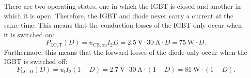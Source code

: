 \begin{solutionblock}
There are two operating states, one in which the IGBT is closed and another in which it is open. Therefore, the IGBT and diode never carry a current at the same time. This means that the conduction losses of the IGBT only occur when it is switched on:
\begin{equation}
    P_{\mathrm{LC,T}}(D) = u_{\mathrm{CE,on}} I_\mathrm{2}  D = \SI {2.5}{\volt}\cdot \SI {30}{\ampere} \cdot D = \SI {75}{\watt} \cdot D .
\end{equation}
Furthermore, this means that the forward losses of the diode only occur when the IGBT is switched off:
\begin{equation}
    P_{\mathrm{LC,D}}(D) = u_{\mathrm{f}} I_\mathrm{2} (1-D)= \SI {2.7}{\volt}\cdot \SI {30}{\ampere} \cdot (1-D) = \SI {81}{\watt} \cdot (1-D) .
    \end{equation}
\end{solutionblock}

